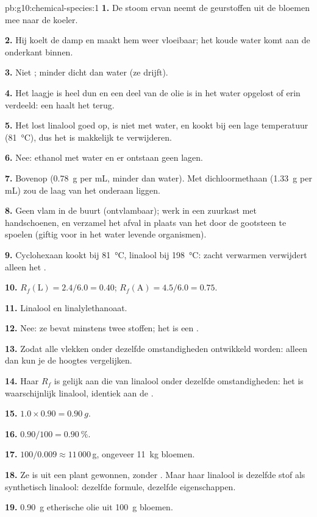\begin{solution}{pb:g10:chemical-species:1}
\textbf{1.} De stoom ervan neemt de geurstoffen uit de bloemen mee naar
de koeler.

\textbf{2.} Hij koelt de damp en maakt hem weer vloeibaar; het koude
water komt aan de onderkant binnen.

\textbf{3.} Niet ; minder dicht dan water (ze drijft).

\textbf{4.} Het laagje is heel dun en een deel van de olie is in het
water opgelost of erin verdeeld: een  haalt het terug.

\textbf{5.} Het lost linalool goed op, is niet  met water, en
kookt bij een lage temperatuur (\qty{81}{\celsius}), dus het is makkelijk
te verwijderen.

\textbf{6.} Nee: ethanol  met water en er ontstaan geen lagen.

\textbf{7.} Bovenop (\qty{0.78}{g} per mL, minder dan water). Met
dichloormethaan (\qty{1.33}{g} per mL) zou de laag van het 
onderaan liggen.

\textbf{8.} Geen vlam in de buurt (ontvlambaar); werk in een zuurkast met
handschoenen, en verzamel het afval in plaats van het door de gootsteen
te spoelen (giftig voor in het water levende organismen).

\textbf{9.} Cyclohexaan kookt bij \qty{81}{\celsius}, linalool bij
\qty{198}{\celsius}: zacht verwarmen verwijdert alleen het .

\textbf{10.} $R_f(\text{L}) = 2.4/6.0 = 0.40$; $R_f(\text{A}) = 4.5/6.0
= 0.75$.

\textbf{11.} Linalool en linalylethanoaat.

\textbf{12.} Nee: ze bevat minstens twee stoffen; het is een .

\textbf{13.} Zodat alle vlekken onder dezelfde omstandigheden ontwikkeld
worden: alleen dan kun je de hoogtes vergelijken.

\textbf{14.} Haar $R_f$ is gelijk aan die van linalool onder dezelfde
omstandigheden: het is waarschijnlijk linalool, identiek aan de
.

\textbf{15.} $1.0 \times 0.90 = \qty{0.90}{g}$.

\textbf{16.} $0.90/100 = \qty{0.90}{\percent}$.

\textbf{17.} $100/0.009 \approx 11\,000$\,g, ongeveer \qty{11}{kg}
bloemen.

\textbf{18.} Ze is uit een plant gewonnen, zonder .
Maar haar linalool is dezelfde stof als synthetisch linalool: dezelfde
formule, dezelfde eigenschappen.

\textbf{19.} \qty{0.90}{g} etherische olie uit \qty{100}{g} bloemen.
\end{solution}
